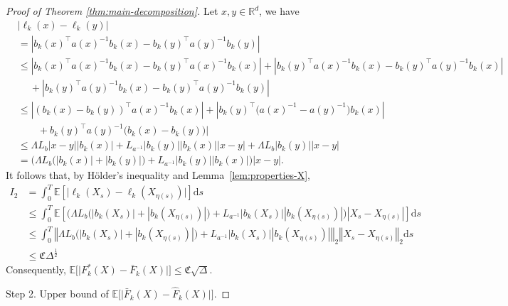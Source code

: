\documentclass{article}
\theoremstyle{plain}
\theoremstyle{definition}
\theoremstyle{remark}
\renewcommand{\d}{\mathrm{d}}
\newcommand{\RD}{\mathbb{R}^{d}}
\newcommand{\EE}{\mathbb{E}}
\begin{document}
\begin{proof}[Proof of Theorem \ref{thm:main-decomposition}]
Let $x,y \in \RD$, we have 
\begin{align}
   &|\ell_k(x)-\ell_k(y)|\nonumber\\
   &=|b_k(x)^{\top} a(x)^{-1} b_k(x)-b_k(y)^{\top} a(y)^{-1} b_k(y)|\nonumber\\
   &\leq |b_k(x)^{\top} a(x)^{-1} b_k(x)-b_k(y)^{\top} a(x)^{-1} b_k(x) |+|b_k(y)^{\top} a(x)^{-1} b_k(x) -b_k(y)^{\top} a(y)^{-1} b_k(x) |\nonumber\\
   &\quad \:+|b_k(y)^{\top} a(y)^{-1} b_k(x)  - b_k(y)^{\top} a(y)^{-1} b_k(y)|\nonumber\\
   &\leq |(b_k(x)-b_k(y))^{\top}a(x)^{-1} b_k(x)|+|b_k(y)^{\top} \big(a(x)^{-1}-a(y)^{-1}\big) b_k(x) |\nonumber\\
   &\qquad +b_k(y)^{\top} a(y)^{-1} \big(b_k(x)  -  b_k(y)\big)|\nonumber\\
   & \leq \Lambda L_b|x-y||b_k(x)|+ L_{a^{-1}}|b_k(y)||b_k(x)||x-y|+\Lambda L_b|b_k(y)||x-y| \nonumber\\
   &=\Big( \Lambda L_b\big(|b_k(x)|+|b_k(y)|\big)+L_{a^{-1}}|b_k(y)||b_k(x)|\Big)|x-y|. 
\end{align}
It follows that, by Hölder's inequality and Lemma~\ref{lem:properties-X},
\begin{align}
    I_2&=\int_0^T \EE \left[\big| \ell_k(X_s)-\ell_k(X_{\eta(s)})\big|\right]\d s\nonumber\\
    &\leq \int_0^T \EE \left[\Big( \Lambda L_b\big(|b_k(X_s)|+|b_k(X_{\eta(s)})|\big)+L_{a^{-1}}|b_k(X_s)||b_k(X_{\eta(s)})|\Big)|X_s-X_{\eta(s)}|\right]\d s\nonumber\\
    &\leq \int_0^T\left\Vert \Lambda L_b\big(|b_k(X_s)|+|b_k(X_{\eta(s)})|\big)+L_{a^{-1}}|b_k(X_s)||b_k(X_{\eta(s)})|\right\Vert_2\left \Vert X_s-X_{\eta(s)}\right\Vert_2 \d s\nonumber\\
    &\leq \mathfrak{C}\Delta^{\frac{1}{2}} 
\end{align}
Consequently, $\EE \big[ \big|F_k^*(X)-\bar F_k(X) \big|\big]\leq \mathfrak{C}\sqrt{\Delta}$.


{\sc Step 2. Upper bound of $\EE \big[ \big|\bar F_k(X)-\widehat F_k(X) \big|\big]$.}


\end{proof}
\end{document}
